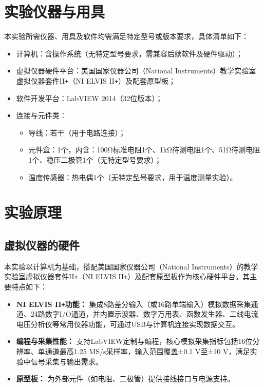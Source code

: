 \documentclass[11pt]{article}
\begin{document}
\section{实验仪器与用具}
本实验所需仪器、用具及软件均需满足特定型号或版本要求，具体清单如下：
\begin{itemize}
    \item 计算机：含操作系统（无特定型号要求，需兼容后续软件及硬件驱动）；
    \item 虚拟仪器硬件平台：美国国家仪器公司（National Instruments）教学实验室虚拟仪器套件II\texttt{+}（NI ELVIS II\texttt{+}）及配套原型板；
    \item 软件开发平台：LabVIEW 2014（32位版本）；
    \item 连接与元件类：
          \begin{itemize}
              \item 导线：若干（用于电路连接）；
              \item 元件盒：1个，内含：100Ω标准电阻1个、1kΩ待测电阻1个、51Ω待测电阻1个、稳压二极管1个（无特定型号要求）；
              \item 温度传感器：热电偶1个（无特定型号要求，用于温度测量实验）。
          \end{itemize}
\end{itemize}

\section{实验原理}
\subsection{虚拟仪器的硬件}
本实验以计算机为基础，搭配美国国家仪器公司（National Instruments）的教学实验室虚拟仪器套件II\texttt{+}（NI ELVIS II\texttt{+}）及配套原型板作为核心硬件平台。其主要特点如下：
\begin{itemize}
    \item \textbf{NI ELVIS II\texttt{+}功能：} 集成8路差分输入（或16路单端输入）模拟数据采集通道、24路数字I/O通道，并内置示波器、数字万用表、函数发生器、二线电流电压分析仪等常用仪器功能，可通过USB与计算机连接实现数据交互。
    \item \textbf{编程与采集性能：} 支持LabVIEW定制与编程，核心模拟采集指标包括16位分辨率、单通道最高1.25 MS/s采样率，输入范围覆盖±0.1 V至±10 V，满足实验中信号采集与输出需求。
    \item \textbf{原型板：} 为外部元件（如电阻、二极管）提供接线接口与电源支持。
\end{itemize}
\end{document}
